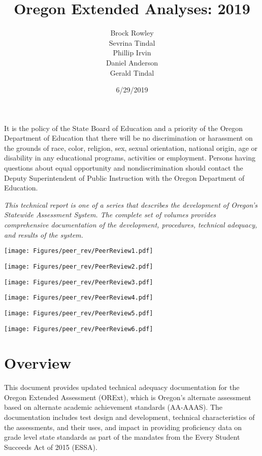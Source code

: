 \documentclass[]{article}
\title{Oregon Extended Analyses: 2019}
\author{Brock Rowley \\ Sevrina Tindal \\ Phillip Irvin \\ Daniel Anderson \\ Gerald Tindal}
\date{6/29/2019}
\begin{document}
\maketitle

{
\setcounter{tocdepth}{5}
\tableofcontents
}
It is the policy of the State Board of Education and a priority of the
Oregon Department of Education that there will be no discrimination or
harassment on the grounds of race, color, religion, sex, sexual
orientation, national origin, age or disability in any educational
programs, activities or employment. Persons having questions about equal
opportunity and nondiscrimination should contact the Deputy
Superintendent of Public Instruction with the Oregon Department of
Education.

\emph{This technical report is one of a series that describes the
development of Oregon's Statewide Assessment System. The complete set of
volumes provides comprehensive documentation of the development,
procedures, technical adequacy, and results of the system.}

\newpage

\texttt{[image: Figures/peer\_rev/PeerReview1.pdf]}

\newpage

\texttt{[image: Figures/peer\_rev/PeerReview2.pdf]}

\newpage

\texttt{[image: Figures/peer\_rev/PeerReview3.pdf]}

\newpage

\texttt{[image: Figures/peer\_rev/PeerReview4.pdf]}

\newpage

\texttt{[image: Figures/peer\_rev/PeerReview5.pdf]}

\newpage

\texttt{[image: Figures/peer\_rev/PeerReview6.pdf]}

\hypertarget{overview}{%
\section{Overview}\label{overview}}

This document provides updated technical adequacy documentation for the
Oregon Extended Assessment (ORExt), which is Oregon's alternate
assessment based on alternate academic achievement standards (AA-AAAS).
The documentation includes test design and development, technical
characteristics of the assessments, and their uses, and impact in
providing proficiency data on grade level state standards as part of the
mandates from the Every Student Succeeds Act of 2015 (ESSA).
\end{document}
